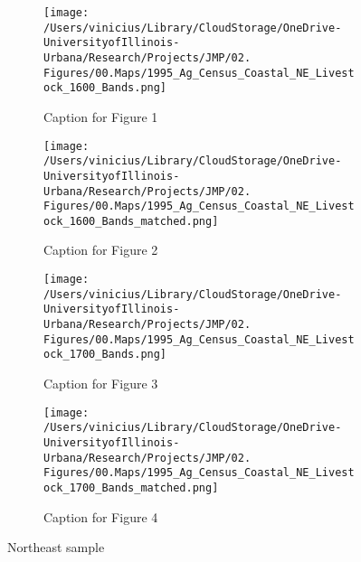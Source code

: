\documentclass[11pt]{article}
\begin{document}
\clearpage

\begin{landscape}
  \begin{figure}[htbp]
    \centering
    \begin{subfigure}[b]{0.65\textwidth}
        \centering
        \texttt{[image: /Users/vinicius/Library/CloudStorage/OneDrive-UniversityofIllinois-Urbana/Research/Projects/JMP/02. Figures/00.Maps/1995\_Ag\_Census\_Coastal\_NE\_Livestock\_1600\_Bands.png]}
        \caption{Caption for Figure 1}
        \label{fig:fig1}
    \end{subfigure}
    \hfill
    \begin{subfigure}[b]{0.65\textwidth}
        \centering
        \texttt{[image: /Users/vinicius/Library/CloudStorage/OneDrive-UniversityofIllinois-Urbana/Research/Projects/JMP/02. Figures/00.Maps/1995\_Ag\_Census\_Coastal\_NE\_Livestock\_1600\_Bands\_matched.png]}
        \caption{Caption for Figure 2}
        \label{fig:fig2}
    \end{subfigure}

    \vspace{0.1cm} %

    \begin{subfigure}[b]{0.65\textwidth}
        \centering
        \texttt{[image: /Users/vinicius/Library/CloudStorage/OneDrive-UniversityofIllinois-Urbana/Research/Projects/JMP/02. Figures/00.Maps/1995\_Ag\_Census\_Coastal\_NE\_Livestock\_1700\_Bands.png]}
        \caption{Caption for Figure 3}
        \label{fig:fig3}
    \end{subfigure}
    \hfill
    \begin{subfigure}[b]{0.65\textwidth}
        \centering
        \texttt{[image: /Users/vinicius/Library/CloudStorage/OneDrive-UniversityofIllinois-Urbana/Research/Projects/JMP/02. Figures/00.Maps/1995\_Ag\_Census\_Coastal\_NE\_Livestock\_1700\_Bands\_matched.png]}
        \caption{Caption for Figure 4}
        \label{fig:fig4}
    \end{subfigure}

    \vspace{1cm}

    \caption{Northeast sample}
    \label{fig:robustness_NE_distance_cutoff}
    
\end{figure}
\end{landscape}

\clearpage
\end{document}
